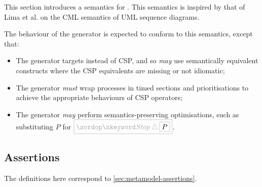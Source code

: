 
This section introduces a \tockcsp{} semantics for \langname.
This semantics is inspired by that of Lima et al. on the CML semantics of
UML sequence diagrams.

The behaviour of the \langname{} generator is expected to conform to
this semantics, except that:

\begin{itemize}
\item
  The generator targets \cspm{} instead of CSP, and so \emph{may}
  use semantically equivalent \cspm{} constructs where the CSP equivalents
  are missing or not idiomatic;
\item
  The generator \emph{must}  wrap processes in
  timed sections and prioritisations to achieve the appropriate \tockcsp{} behaviours of
  CSP operators;
\item
  The generator \emph{may} perform semantics-preserving optimisations,
  such as substituting \(P\) for \(\tlang{\Stop \interrupt \olang{P}}\).
\end{itemize}


\subsection{Assertions}

The definitions here correspond to \cref{sec:metamodel-assertions}.

